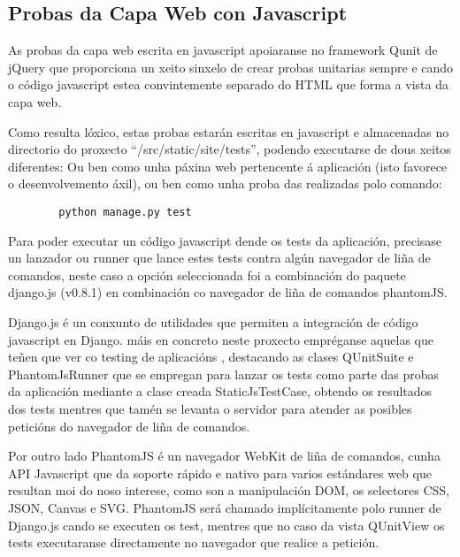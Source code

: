     \subsection{Probas da Capa Web con Javascript}
        As probas da capa web escrita en javascript apoiaranse no framework Qunit de 
        jQuery que proporciona un xeito sinxelo de crear probas unitarias sempre e cando o código 
        javascript estea convintemente separado do HTML que forma a vista da capa web.
        
        Como resulta lóxico, estas probas estarán escritas en javascript e almacenadas no directorio
        do proxecto ``/src/static/site/tests'', podendo executarse de dous xeitos diferentes: Ou ben 
        como unha páxina web pertencente á aplicación (isto favorece o desenvolvemento áxil), ou ben
        como unha proba das realizadas polo comando:
        \begin{verbatim}
        python manage.py test
        \end{verbatim}
        
        Para poder executar un código javascript dende os tests da aplicación, 
        precisase un lanzador ou runner que lance estes tests contra algún navegador de liña de 
        comandos, neste caso a opción seleccionada foi a combinación do paquete django.js (v0.8.1)
        en combinación co navegador de liña de comandos phantomJS. 
        
        Django.js é un conxunto de utilidades que permiten a integración de código javascript en 
        Django. máis en concreto neste proxecto empréganse aquelas que teñen que ver co testing de
        aplicacións \cite{DjangojsTestTools}, destacando as clases QUnitSuite e PhantomJsRunner que se
        empregan para lanzar os tests como parte das probas da aplicación mediante a clase creada
        StaticJsTestCase, obtendo os resultados dos tests mentres que tamén se levanta o servidor
        para atender as posibles peticións do navegador de liña de comandos.
        
        Por outro lado PhantomJS é un navegador WebKit de liña de comandos, cunha API Javascript que
        da soporte rápido e nativo para varios estándares web que resultan moi do noso interese,
        como son a manipulación DOM, os selectores CSS, JSON, Canvas e SVG. PhantomJS será chamado
        implícitamente polo runner de Django.js cando se executen os test, mentres que no caso da 
        vista QUnitView os tests executaranse directamente no navegador que realice a petición.
        
